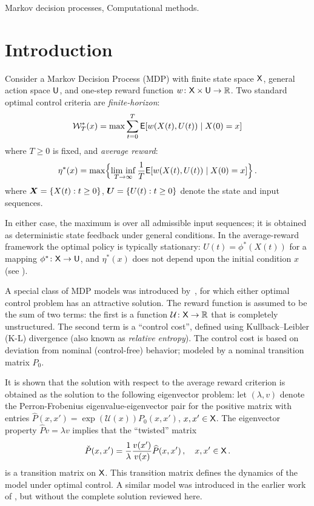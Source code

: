 \documentclass[final,12pt]{colt2018} %
\def\util{{\mathcal{U}}}
\def\reward{w}
\def\liminf{\mathop{\rm lim\ inf}}
\def\U{{\sf U}}
\def\state{{\sf X}}
\newcommand{\field}[1]{\mathbb{#1}}
\def\Re{\field{R}}
\def\cP{{\check{P}}}
\def\bfmath#1{{\mathchoice{\mbox{\boldmath$#1$}}%
{\mbox{\boldmath$#1$}}%
{\mbox{\boldmath$\scriptstyle#1$}}%
{\mbox{\boldmath$\scriptscriptstyle#1$}}}}
\def\bfmU{\bfmath{U}}
\def\bfmX{\bfmath{X}}
\def\haP{{\widehat P}}
\def\clW{{\cal W}}
\def\Expect{{\sf E}}
\def\Re{\field{R}}
\begin{document}
\begin{keywords}
 Markov decision processes,  Computational methods.
\end{keywords}

\section{Introduction}

\label{s:intro} 


Consider a Markov Decision Process (MDP) with finite state space $\state$, general action space $\U$,  and  one-step reward  function $\reward\colon\state\times\U\to\Re$.   Two standard optimal control criteria are \textit{finite-horizon}:
\begin{equation}
\clW^*_T(x) = \max \sum_{t=0}^T  \Expect[  \reward(X(t),U(t))  \mid X(0)=x ]
\label{e:TCobjectiveReward_intro}
\end{equation}
where $T\ge 0$ is fixed,   and \textit{average reward}:
\begin{equation} 
\eta^*(x) =\max\Bigl\{ \liminf_{T\to\infty}\frac{1}{T}  \Expect[  \reward(X(t),U(t))    \mid X(0)=x ]  \Bigr\}\,.
\label{e:ARobjectiveReward_intro}
\end{equation}
where $\bfmX=\{X(t): t\ge 0\}$, $\bfmU=\{U(t): t\ge 0\}$ denote the state and input sequences.
 

In either case, the maximum is over all  admissible input sequences; it is obtained as deterministic state feedback under general conditions. In the average-reward framework the optimal policy is typically stationary:  $U(t) = \phi^*(X(t))$ for a mapping $\phi^*\colon\state\to\U$,  and $\eta^*(x) $ does not depend upon the initial condition $x$   (see \cite{put14,bershr96a}).   

 
A special class of MDP models was introduced by~\cite{tod07}, for which either   optimal control problem has an attractive solution.  The reward   function is assumed to be the sum of two terms: 
the first is a function   $\util\colon\state\to\Re$ that is completely unstructured.   The second term is a ``control cost'',  defined using   Kullback--Leibler  (K-L) divergence (also known as \textit{relative entropy}).   The control cost is based on deviation from nominal (control-free) behavior;  modeled by a nominal transition matrix $P_0$. 


It is shown that the solution with respect to the average reward criterion is obtained as the solution to the following eigenvector problem:  let $(\lambda,v)$ denote the Perron-Frobenius eigenvalue-eigenvector pair for the positive matrix with entries  $\haP(x,x') = \exp(\util(x)) P_0(x,x')$,  $x,x'\in\state$.
The eigenvector property
$
\haP v = \lambda v
$ implies that the ``twisted'' matrix 
\begin{equation}
\cP(x,x') 
=
\frac{1}{\lambda}
\frac{v(x')}{v(x)}
\haP(x,x')  \,, \quad x,x'\in\state\, .
\label{e:twistedP}
\end{equation}
is a transition matrix on $\state$.  This transition matrix defines the dynamics of the model under optimal control.  A similar model was introduced in the earlier work of  \cite{kar96}, but without the complete solution reviewed here. 
\end{document}
